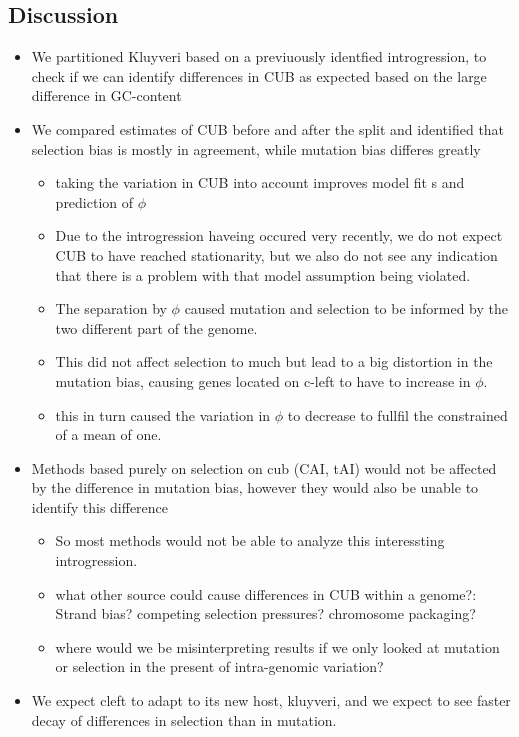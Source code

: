 \documentclass[12pt]{article}
\begin{document}
\subsection*{Discussion}
\begin{itemize}
	\item We partitioned Kluyveri based on a previuously identfied introgression, to check if we can identify differences in CUB as expected based on the large difference in GC-content
	\item We compared estimates of CUB before and after the split and identified that selection bias is mostly in agreement, while mutation bias differes greatly
	\begin{itemize}
		\item taking the variation in CUB into account improves model fit	s and prediction of $\phi$
		\item Due to the introgression haveing occured very recently, we do not expect CUB to have reached stationarity, but we also do not see any indication that there is a problem with that model assumption being violated.
		\item The separation by $\phi$ caused mutation and selection to be informed by the two different part of the genome.
		\item This did not affect selection to much but lead to a big distortion in the mutation bias, causing genes located on c-left to have to increase in $\phi$.
		\item this in turn caused the variation in $\phi$ to decrease to fullfil the constrained of a mean of one.
	\end{itemize}
	\item Methods based purely on selection on cub (CAI, tAI) would not be affected by the difference in mutation bias, however they would also be unable to identify this difference
	\begin{itemize}
		\item So most methods would not be able to analyze this interessting introgression.
		\item what other source could cause differences in CUB within a genome?: Strand bias? competing selection pressures? chromosome packaging?
		\item where would we be misinterpreting results if we only looked at mutation or selection in the present of intra-genomic variation?
	\end{itemize}
	\item We expect cleft to adapt to its new host, kluyveri, and we expect to see faster decay of differences in selection than in mutation.

\end{itemize}
\end{document}
